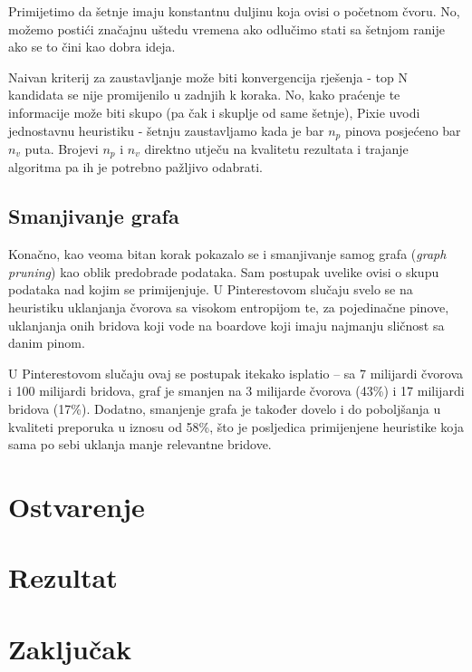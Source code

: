 \documentclass[times, utf8, seminar]{fer}
\begin{document}
Primijetimo da šetnje imaju konstantnu duljinu koja ovisi o početnom čvoru. No, možemo postići značajnu uštedu vremena ako odlučimo stati sa šetnjom ranije ako se to čini kao dobra ideja.

Naivan kriterij za zaustavljanje može biti konvergencija rješenja - top N kandidata se nije promijenilo u zadnjih k koraka. No, kako praćenje te informacije može biti skupo (pa čak i skuplje od same šetnje), Pixie uvodi jednostavnu heuristiku - šetnju zaustavljamo kada je bar $n_p$ pinova posjećeno bar $n_v$ puta. Brojevi $n_p$ i $n_v$ direktno utječu na kvalitetu rezultata i trajanje algoritma pa ih je potrebno pažljivo odabrati.

\section{Smanjivanje grafa}

Konačno, kao veoma bitan korak pokazalo se i smanjivanje samog grafa (\textit{graph pruning}) kao oblik predobrade podataka. Sam postupak uvelike ovisi o skupu podataka nad kojim se primijenjuje. U Pinterestovom slučaju svelo se na heuristiku uklanjanja čvorova sa visokom entropijom te, za pojedinačne pinove, uklanjanja onih bridova koji vode na boardove koji imaju najmanju sličnost sa danim pinom.

U Pinterestovom slučaju ovaj se postupak itekako isplatio -- sa 7 milijardi čvorova i 100 milijardi bridova, graf je smanjen na 3 milijarde čvorova (43\%) i 17 milijardi bridova (17\%). Dodatno, smanjenje grafa je također dovelo i do poboljšanja u kvaliteti preporuka u iznosu od 58\%, što je posljedica primijenjene heuristike koja sama po sebi uklanja manje relevantne bridove.

\chapter{Ostvarenje}

\chapter{Rezultat}

\chapter{Zaključak}



\end{document}
